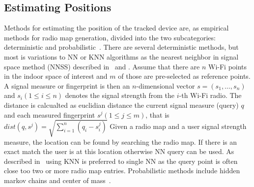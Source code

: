 \subsection{Estimating Positions}
Methods for estimating the position of the tracked device are, as empirical methods for radio map generation, divided into the two subcategories: deterministic and probabilistic~\cite{taxonomy2007}.
There are several deterministic methods, but most is variations to NN or KNN algorithms as
the nearest neighbor in signal space method (NNSS)
described in~\cite{6068444} and \cite{radarlf}.
Assume that there are $n$ Wi-Fi points in the indoor space of interest and $m$ of those are pre-selected as reference points. 
A signal measure or fingerprint is then an $n$-dimensional vector $s=(s_{1},\dots,s_{n})$ and $s_{i} (1 \le  i \le n)$ denotes the signal strength from the $i$-th Wi-Fi radio. 
The distance is calcualted as euclidian distance the current signal measure (query) $q$ and each measured fingerprint $s^{j} (1 \le j \le m)$, 
that is $dist(q,s^{j}) = \sqrt{\sum_{i=1}^{n}\left(q_{i}-s^{j}_{i}\right)}$ 
Given a radio map and a user signal strength measure, the location can be found by searching the radio map. 
If there is an exact match the user is at this location otherwise NN query can be used.
As described in~\cite{ariadne2006} using KNN is preferred to single NN as the query point is often close too two or more radio map entries.
Probabilistic methods include hidden markov chains and center of mass~\cite{Youssef2005}.

 






